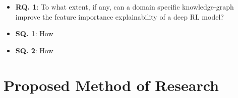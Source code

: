 \documentclass[11pt]{article}
\begin{document}
\begin{itemize}
  \item \textbf{RQ. 1}: To what extent, if any, can a domain specific knowledge-graph improve the feature importance explainability of a deep RL model?
  \item \textbf{SQ. 1}: How
  \item \textbf{SQ. 2}: How 
\end{itemize}



\section{Proposed Method of Research}
\end{document}
